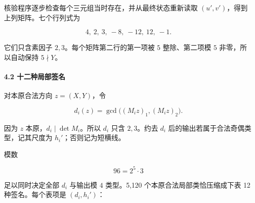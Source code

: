 \documentclass[11pt,a4paper]{article}
\theoremstyle{definition}
\numberwithin{equation}{section}
\begin{document}
{核验程序逐步检查每个三元组当时存在，并从最终状态重新读取} \((u',v')\){，得到上列矩阵。七个行列式为}

\[
4,\ 2,\ 3,\ -8,\ -12,\ 12,\ -1.
\]

{它们只含素因子} \(2,3\){。每个矩阵第二行的第一项被} \(5\) {整除、第二项模} \(5\) {非零，所以自动保持} \(5\nmid Y\){。}

\paragraph*{\texorpdfstring{{4.2} {十二种局部签名}}{4.2 十二种局部签名}}\label{C35-h238}

{对本原合法方向} \(z=(X,Y)\){，令}

\[
d_i(z)=\gcd\bigl((M_iz)_1,(M_iz)_2\bigr).
\]

{因为} \(z\) {本原，}\(d_i\mid\det M_i\){。所以} \(d_i\) {只含} \(2,3\){。约去} \(d_i\) {后的输出若属于合法奇偶类型，记其尺度为} \(h_i'\){；否则记为短横线。}

{模数}

\[
96=2^5\cdot3
\]

{足以同时决定全部} \(d_i\) {与输出模} \(4\) {类型。5,120} {个本原合法局部类恰压缩成下表} {12} {种签名。每个表项是} \((d_i,h_i')\){：}
\end{document}
